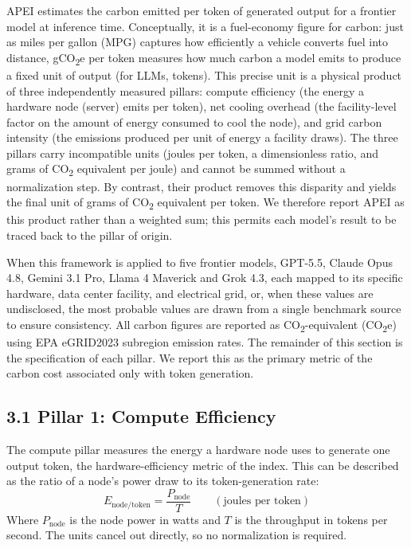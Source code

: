 \documentclass[11pt]{article}
\newcommand{\cotwo}{CO\textsubscript{2}}     %
\begin{document}
APEI estimates the carbon emitted per token of generated output for a frontier model at inference time. Conceptually, it is a fuel-economy figure for carbon: just as miles per gallon (MPG) captures how efficiently a vehicle converts fuel into distance, g\cotwo e per token measures how much carbon a model emits to produce a fixed unit of output (for LLMs, tokens). This precise unit is a physical product of three independently measured pillars: compute efficiency (the energy a hardware node (server) emits per token), net cooling overhead (the facility-level factor on the amount of energy consumed to cool the node), and grid carbon intensity (the emissions produced per unit of energy a facility draws). The three pillars carry incompatible units (joules per token, a dimensionless ratio, and grams of \cotwo{} equivalent per joule) and cannot be summed without a normalization step. By contrast, their product removes this disparity and yields the final unit of grams of \cotwo{} equivalent per token. We therefore report APEI as this product rather than a weighted sum; this permits each model's result to be traced back to the pillar of origin.

When this framework is applied to five frontier models, GPT-5.5, Claude Opus 4.8, Gemini 3.1 Pro, Llama 4 Maverick and Grok 4.3, each mapped to its specific hardware, data center facility, and electrical grid, or, when these values are undisclosed, the most probable values are drawn from a single benchmark source to ensure consistency. All carbon figures are reported as \cotwo-equivalent (\cotwo e) using EPA eGRID2023 subregion emission rates. The remainder of this section is the specification of each pillar. We report this as the primary metric of the carbon cost associated only with token generation.

\subsection*{3.1 Pillar 1: Compute Efficiency}

The compute pillar measures the energy a hardware node uses to generate one output token, the hardware-efficiency metric of the index. This can be described as the ratio of a node's power draw to its token-generation rate:
\[
E_{\text{node/token}} = \frac{P_{\text{node}}}{T} \qquad (\text{joules per token})
\]
Where $P_{\text{node}}$ is the node power in watts and $T$ is the throughput in tokens per second. The units cancel out directly, so no normalization is required.
\end{document}
